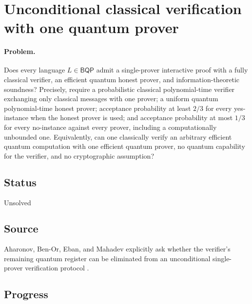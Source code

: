 \section{Unconditional classical verification with one quantum prover}
\label{sec:problem-39}

\paragraph{Problem.}
Does every language $L\in\mathsf{BQP}$ admit a single-prover interactive proof
with a fully classical verifier, an efficient quantum honest prover, and
information-theoretic soundness?  Precisely, require a probabilistic classical
polynomial-time verifier exchanging only classical messages with one prover;
a uniform quantum polynomial-time honest prover; acceptance probability at
least $2/3$ for every yes-instance when the honest prover is used; and
acceptance probability at most $1/3$ for every no-instance against every
prover, including a computationally unbounded one.  Equivalently, can one
classically verify an arbitrary efficient quantum computation with one
efficient quantum prover, no quantum capability for the verifier, and no
cryptographic assumption?

\subsection*{Status}

Unsolved

\subsection*{Source}

Aharonov, Ben-Or, Eban, and Mahadev explicitly ask whether the verifier's
remaining quantum register can be eliminated from an unconditional
single-prover verification protocol
.

\subsection*{Progress}

